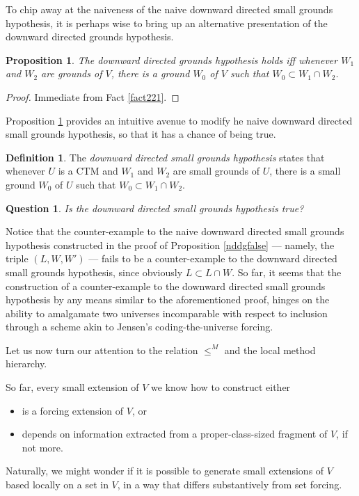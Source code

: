 \documentclass[12pt, twoside]{memoir}
\numberwithin{equation}{section}
\newtheorem{prop}[thm]{Proposition}
\newtheorem{ques}[thm]{Question}
\theoremstyle{definition}
\newtheorem{defi}[thm]{Definition}
\theoremstyle{remark}
\theoremstyle{definition}
\theoremstyle{definition}
\theoremstyle{definition}
\theoremstyle{remark}
\begin{document}
To chip away at the naiveness of the naive downward directed small grounds hypothesis, it is perhaps wise to bring up an alternative presentation of the downward directed grounds hypothesis.

\begin{prop}\label{prop8410}
The downward directed grounds hypothesis holds iff whenever $W_1$ and $W_2$ are grounds of $V$, there is a ground $W_0$ of $V$ such that $W_0 \subset W_1 \cap W_2$.
\end{prop}

\begin{proof}
Immediate from Fact \ref{fact221}.
\end{proof}

Proposition \ref{prop8410} provides an intuitive avenue to modify he naive downward directed small grounds hypothesis, so that it has a chance of being true.

\begin{defi}\label{ddsg}
The \emph{downward directed small grounds hypothesis} states that whenever $U$ is a CTM and $W_1$ and $W_2$ are small grounds of $U$, there is a small ground $W_0$ of $U$ such that $W_0 \subset W_1 \cap W_2$.
\end{defi}

\begin{ques}
Is the downward directed small grounds hypothesis true?
\end{ques}

Notice that the counter-example to the naive downward directed small grounds hypothesis constructed in the proof of Proposition \ref{nddgfalse} --- namely, the triple $(L, W, W')$ --- fails to be a counter-example to the downward directed small grounds hypothesis, since obviously $L \subset L \cap W$. So far, it seems that the construction of a counter-example to the downward directed small grounds hypothesis by any means similar to the aforementioned proof, hinges on the ability to amalgamate two universes incomparable with respect to inclusion through a scheme akin to Jensen's coding-the-universe forcing.

Let us now turn our attention to the relation $\leq^M$ and the local method hierarchy.

So far, every small extension of $V$ we know how to construct either
\begin{itemize}
    \item is a forcing extension of $V$, or
    \item depends on information extracted from a proper-class-sized fragment of $V$, if not more.
\end{itemize} 
Naturally, we might wonder if it is possible to generate small extensions of $V$ based locally on a set in $V$, in a way that differs substantively from set forcing.
\end{document}

